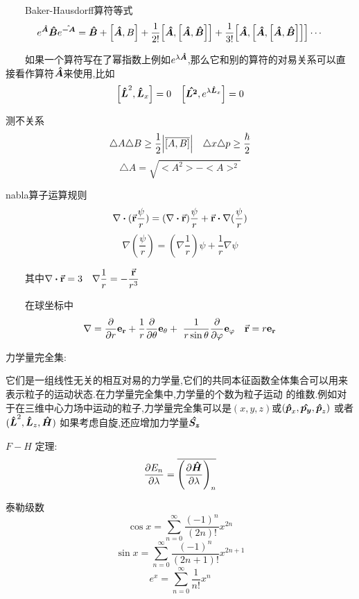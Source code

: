 \begin{formal}
            $\qquad$Baker-Hausdorff算符等式
            $$ 
            e^{\vu*{A}} \vu*{B} e^{\vu*{-A}} = \vu*{B} + \comm{\vu*{A}}{B} + \frac{1}{2!} \comm{\vu*{A}}{\comm{\vu*{A}}{\vu*{B}}} + 
            \frac{1}{3!} \comm{\vu*{A}}{\comm{\vu*{A}}{\comm{\vu*{A}}{\vu*{B}}}} \cdots 
            $$


            $\qquad$如果一个算符写在了幂指数上例如$e^{\lambda \vu*{A}}$,那么它和别的算符的对易关系可以直接看作算符$\vu*{A}$来使用,比如
            $$ \comm{\vu*{L}^{2}}{\vu*{L}_{x}} = 0 \quad \comm{\vu*{L^{2}}}{e^{\lambda \vu*{L}_{x}}} = 0 $$
        
            
            测不关系
            $$ \triangle{A} \triangle{B} \geq \frac{1}{2} \abs{\overline{\comm{A}{B}}} \quad \triangle{x} \triangle{p} \geq \frac{\hbar}{2}   $$
            $$ \triangle{A} = \sqrt{<A^{2}> - <A>^{2}} $$
            
            nabla算子运算规则
            $$ \nabla \vdot (\va{r} \frac{\psi}{r})  =  (\nabla \vdot \va{r}) \frac{\psi}{r} + \va{r} \vdot \nabla(\frac{\psi}{r}) $$
            $$ \nabla (\frac{\psi}{r}) = (\nabla \frac{1}{r})\psi + \frac{1}{r} \nabla \psi $$
            
            $\qquad$其中$ \nabla \vdot \va{r} = 3 \quad \nabla \dfrac{1}{r} = - \dfrac{\va{r}}{r^{3}} $

            $\qquad$在球坐标中
            $$ \nabla =  \pdv{r} \vb{e_{r}} +  \frac{1}{r} \pdv{\theta} \vb{e_{\theta}} + \ \frac{1}{r \sin{\theta}} \pdv{\varphi} \vb{e_{\varphi}} \quad \va{r} = r \vb{e_{r}}  $$         

            力学量完全集:
            
            \indent 它们是一组线性无关的相互对易的力学量,它们的共同本征函数全体集合可以用来表示粒子的运动状态.在力学量完全集中,力学量的个数为粒子运动
            的维数.例如对于在三维中心力场中运动的粒子,力学量完全集可以是$(x,y,z)$或$(\vu*{p}_{x} , \vu*{p_{y}} , \vu*{p}_{z})$ 或者$ (\vu*{L}^{2} , \vu*{L}_{z} , \vu*{H}) $ 如果考虑自旋,还应增加力学量$\vu*{S_{z}}$

            $ F - H $ 定理:
             $$ \pdv{E_{n}}{\lambda} = \overline{\qty(\pdv{\vu*{H}}{\lambda})_{n}} $$

            泰勒级数
            $$ \cos{x} = \sum_{n=0}^{\infty} \frac{(-1)^{n}}{(2n)!} x^{2n}  $$
            $$ \sin{x} = \sum_{n=0}^{\infty} \frac{(-1)^{n}}{(2n+1)!} x^{2n+1}  $$
            $$ e^{x} = \sum_{n=0}^{\infty} \frac{1}{n!} x^{n}  $$
            
        \end{formal}

